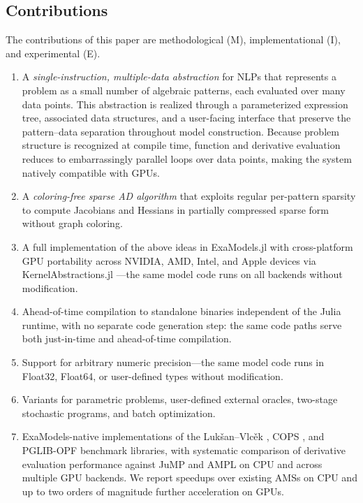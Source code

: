 \documentclass[11pt]{article}
\begin{document}
\subsection{Contributions}
\label{sec:intro:contributions}
The contributions of this paper are methodological (M), implementational (I), and experimental (E).
\begin{enumerate}
  \item[\textbf{M1.}] A \emph{single-instruction, multiple-data abstraction} for NLPs that represents a problem as a small number of algebraic patterns, each evaluated over many data points. This abstraction is realized through a parameterized expression tree, associated data structures, and a user-facing interface that preserve the pattern--data separation throughout model construction. Because problem structure is recognized at compile time, function and derivative evaluation reduces to embarrassingly parallel loops over data points, making the system natively compatible with GPUs.
  \item[\textbf{M2.}] A \emph{coloring-free sparse AD algorithm} that exploits regular per-pattern sparsity to compute Jacobians and Hessians in partially compressed sparse form without graph coloring.
  \item[\textbf{I1.}] A full implementation of the above ideas in ExaModels.jl with cross-platform GPU portability across NVIDIA, AMD, Intel, and Apple devices via KernelAbstractions.jl \citep{churavyKernelAbstractionsjl2025}---the same model code runs on all backends without modification.
  \item[\textbf{I2.}] Ahead-of-time compilation to standalone binaries independent of the Julia runtime, with no separate code generation step: the same code paths serve both just-in-time and ahead-of-time compilation.
  \item[\textbf{I3.}] Support for arbitrary numeric precision---the same model code runs in Float32, Float64, or user-defined types without modification.
  \item[\textbf{I4.}] Variants for parametric problems, user-defined external oracles, two-stage stochastic programs, and batch optimization.
  \item[\textbf{E1.}] ExaModels-native implementations of the Luk\v{s}an--Vlc\v{e}k \citep{lukVsanSparsePartiallySeparable}, COPS \citep{dolanBenchmarkingOptimizationSoftware2001}, and PGLIB-OPF benchmark libraries, with systematic comparison of derivative evaluation performance against JuMP and AMPL on CPU and across multiple GPU backends. We report speedups over existing AMSs on CPU and up to two orders of magnitude further acceleration on GPUs.
\end{enumerate}
\end{document}

